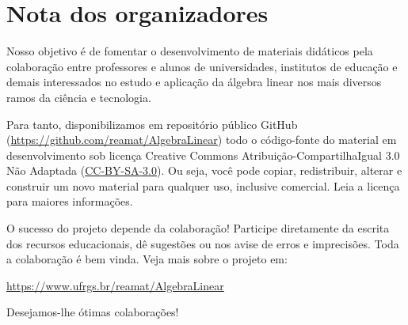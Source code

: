 
\chapter*{Nota dos organizadores}

Nosso objetivo é de fomentar o desenvolvimento de materiais didáticos pela colaboração entre professores e alunos de universidades, institutos de educação e demais interessados no estudo e aplicação da álgebra linear nos mais diversos ramos da ciência e tecnologia.

Para tanto, disponibilizamos em repositório público GitHub (\url{https://github.com/reamat/AlgebraLinear}) todo o código-fonte do material em desenvolvimento sob licença Creative Commons Atribuição-CompartilhaIgual 3.0 Não Adaptada (\href{https://creativecommons.org/licenses/by-sa/3.0/}{CC-BY-SA-3.0}). Ou seja, você pode copiar, redistribuir, alterar e construir um novo material para qualquer uso, inclusive comercial. Leia a licença para maiores informações.

O sucesso do projeto depende da colaboração! Participe diretamente da escrita dos recursos educacionais, dê sugestões ou nos avise de erros e imprecisões. Toda a colaboração é bem vinda. Veja mais sobre o projeto em:
\begin{center}
  \url{https://www.ufrgs.br/reamat/AlgebraLinear}
\end{center}

\vspace{0.5cm}

Desejamos-lhe ótimas colaborações!
